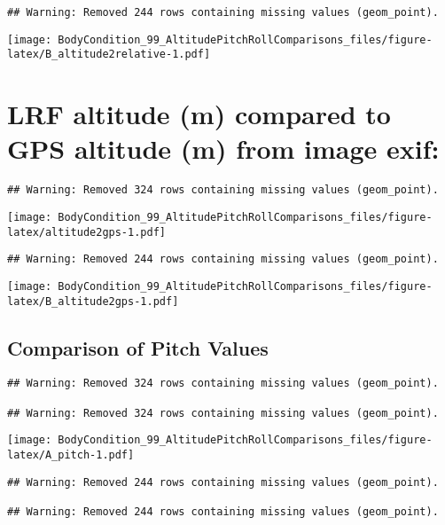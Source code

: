 \documentclass[
]{article}
\begin{document}
\begin{verbatim}
## Warning: Removed 244 rows containing missing values (geom_point).
\end{verbatim}

\texttt{[image: BodyCondition\_99\_AltitudePitchRollComparisons\_files/figure-latex/B\_altitude2relative-1.pdf]}

\hypertarget{lrf-altitude-m-compared-to-gps-altitude-m-from-image-exif}{%
\section{LRF altitude (m) compared to GPS altitude (m) from image
exif:}\label{lrf-altitude-m-compared-to-gps-altitude-m-from-image-exif}}

\begin{verbatim}
## Warning: Removed 324 rows containing missing values (geom_point).
\end{verbatim}

\texttt{[image: BodyCondition\_99\_AltitudePitchRollComparisons\_files/figure-latex/altitude2gps-1.pdf]}

\begin{verbatim}
## Warning: Removed 244 rows containing missing values (geom_point).
\end{verbatim}

\texttt{[image: BodyCondition\_99\_AltitudePitchRollComparisons\_files/figure-latex/B\_altitude2gps-1.pdf]}

\hypertarget{comparison-of-pitch-values}{%
\subsection{Comparison of Pitch
Values}\label{comparison-of-pitch-values}}

\begin{verbatim}
## Warning: Removed 324 rows containing missing values (geom_point).

## Warning: Removed 324 rows containing missing values (geom_point).
\end{verbatim}

\texttt{[image: BodyCondition\_99\_AltitudePitchRollComparisons\_files/figure-latex/A\_pitch-1.pdf]}

\begin{verbatim}
## Warning: Removed 244 rows containing missing values (geom_point).

## Warning: Removed 244 rows containing missing values (geom_point).
\end{verbatim}
\end{document}
